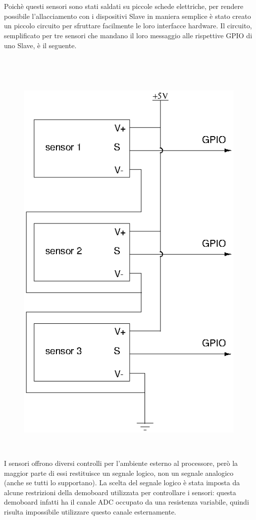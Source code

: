 \documentclass[a4paper,titlepage]{book}
\begin{document}
~

~

Poichè questi sensori sono stati saldati su piccole schede elettriche, per rendere possibile l'allacciamento con i dispositivi Slave in maniera semplice è stato creato un piccolo circuito per sfruttare facilmente le loro interfacce hardware.
Il circuito, semplificato per tre sensori che mandano il loro messaggio alle rispettive GPIO di uno Slave, è il seguente.

~

~

\begin{figure}[!ht]
\centering
\includegraphics[scale=0.5]{circuitSensor.png}
\end{figure}


~

I sensori offrono diversi controlli per l'ambiente esterno al processore, però la maggior parte di essi restituisce un segnale logico, non un segnale analogico (anche se tutti lo supportano). La scelta del segnale logico è stata imposta da alcune restrizioni della demoboard utilizzata per controllare i sensori: questa demoboard infatti ha il canale ADC occupato da una resistenza variabile, quindi risulta impossibile utilizzare questo canale esternamente.
\end{document}
